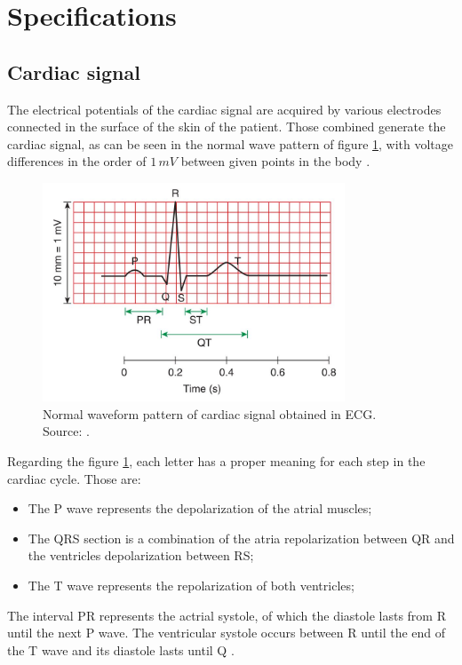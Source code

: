 \section{Specifications}

\subsection{Cardiac signal}

The electrical potentials of the cardiac signal are acquired by various electrodes connected in the surface of the skin of the patient. Those combined generate the cardiac signal, as can be seen in the normal wave pattern of figure \ref{fig:cardiac_signal}, with voltage differences in the order of $1 \, mV$ between given points in the body \cite{khandpur2019compendium}.

\begin{figure}[h!] 
    \centering
    \includegraphics[width=9cm]{images/cardiac_signal.JPG}
    \caption{Normal waveform pattern of cardiac signal obtained in ECG. Source: \textcite{khandpur2019compendium}.}
    \label{fig:cardiac_signal} 
\end{figure}

Regarding the figure \ref{fig:cardiac_signal}, each letter has a proper meaning for each step in the cardiac cycle. Those are:

\begin{itemize}
    \item The P wave represents the depolarization of the atrial muscles;
    \item The QRS section is a combination of the atria repolarization between QR and the ventricles depolarization between RS;
    \item The T wave represents the repolarization of both ventricles;
\end{itemize}

The interval PR represents the actrial systole, of which the diastole lasts from R until the next P wave. The ventricular systole occurs between R until the end of the T wave and its diastole lasts until Q \cite{openstax}. 

